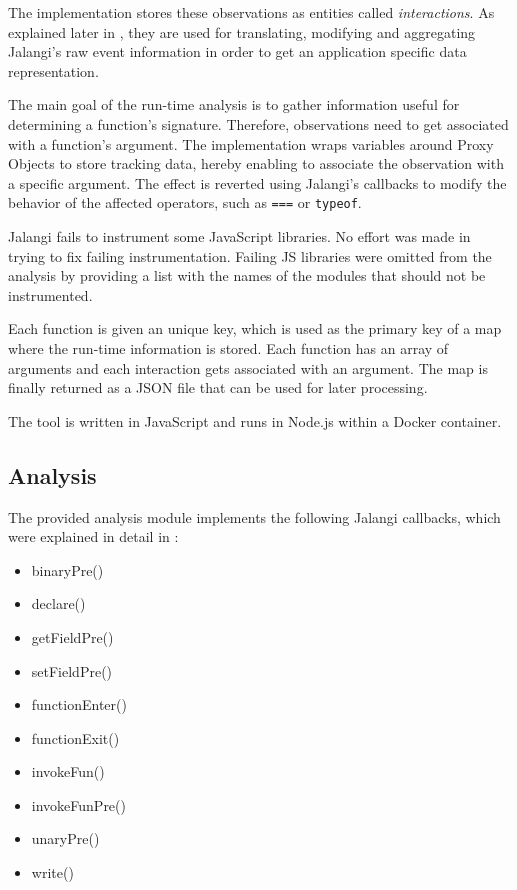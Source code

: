 The implementation stores these observations as entities called \textit{interactions}. As explained later in , they are used for translating, modifying and aggregating Jalangi's raw event information in order to get an application specific data representation.

The main goal of the run-time analysis is to gather information useful for determining a function's signature. Therefore, observations need to get associated with a function's argument. The implementation wraps variables around Proxy Objects to store tracking data, hereby enabling to associate the observation with a specific argument. The effect is reverted using Jalangi's callbacks to modify the behavior of the affected operators, such as \texttt{===} or \texttt{typeof}.

Jalangi fails to instrument some JavaScript libraries. No effort was made in trying to fix failing instrumentation. Failing JS libraries were omitted from the analysis by providing a list with the names of the modules that should not be instrumented.

Each function is given an unique key, which is used as the primary key of a map where the run-time information is stored. Each function has an array of arguments and each interaction gets associated with an argument. The map is finally returned as a JSON file that can be used for later processing.

The tool is written in JavaScript and runs in Node.js within a Docker container.



\subsection{Analysis} \label{sec:run-time-analysis}
The provided analysis module implements the following Jalangi callbacks, which were explained in detail in :
\begin{itemize}
  \item binaryPre()
  \item declare()
  \item getFieldPre()
  \item setFieldPre()
  \item functionEnter()
  \item functionExit()
  \item invokeFun()
  \item invokeFunPre()
  \item unaryPre()
  \item write()
\end{itemize}

